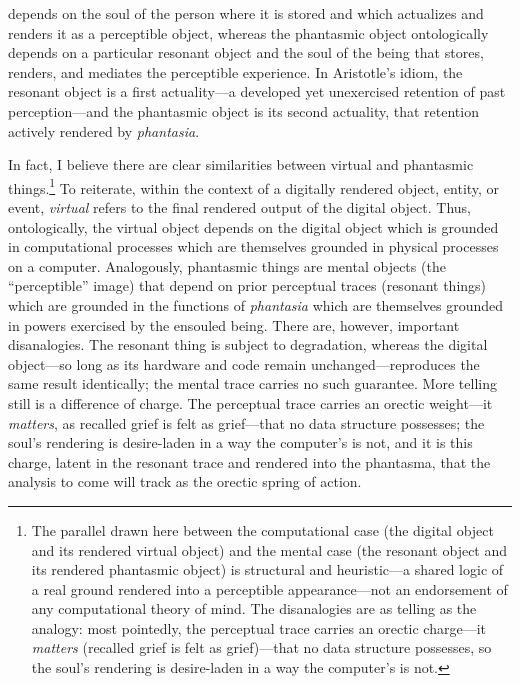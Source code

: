 \documentclass{article}
\begin{document}
depends on the soul of the person where it is stored and which actualizes and renders it as a perceptible object, whereas the phantasmic object ontologically depends on a particular resonant object and the soul of the being that stores, renders, and mediates the perceptible experience. In Aristotle's idiom, the resonant object is a first actuality—a developed yet unexercised retention of past perception—and the phantasmic object is its second actuality, that retention actively rendered by \textit{phantasia}.

In fact, I believe there are clear similarities between virtual and phantasmic things.\footnote{The parallel drawn here between the computational case (the digital object and its rendered virtual object) and the mental case (the resonant object and its rendered phantasmic object) is structural and heuristic—a shared logic of a real ground rendered into a perceptible appearance—not an endorsement of any computational theory of mind. The disanalogies are as telling as the analogy: most pointedly, the perceptual trace carries an orectic charge—it \textit{matters} (recalled grief is felt as grief)—that no data structure possesses, so the soul's rendering is desire-laden in a way the computer's is not.} To reiterate, within the context of a digitally rendered object, entity, or event, \textit{virtual} refers to the final rendered output of the digital object. Thus, ontologically, the virtual object depends on the digital object which is grounded in computational processes which are themselves grounded in physical processes on a computer. Analogously, phantasmic things are mental objects (the ``perceptible'' image) that depend on prior perceptual traces (resonant things) which are grounded in the functions of \textit{phantasia} which are themselves grounded in powers exercised by the ensouled being. There are, however, important disanalogies. The resonant thing is subject to degradation, whereas the digital object—so long as its hardware and code remain unchanged—reproduces the same result identically; the mental trace carries no such guarantee. More telling still is a difference of charge. The perceptual trace carries an orectic weight—it \textit{matters}, as recalled grief is felt as grief—that no data structure possesses; the soul's rendering is desire-laden in a way the computer's is not, and it is this charge, latent in the resonant trace and rendered into the phantasma, that the analysis to come will track as the orectic spring of action.
\end{document}

